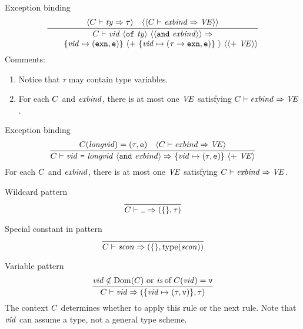 
\begin{inference-rule}{Exception binding}
\begin{equation}\label{rule:static-core:exnbind1}
  \vcenter{\infer{\deduce{\qquad\{\vid\mapsto(\EXCN,\ise)\}\
      \optional{+\ \{\vid\mapsto(\tau\rightarrow\EXCN,\ise)\}\ }\
      \optional{\optional{ +\ \VE}}}
      {\C\ts\longvidexnbinda\ra}}
    {\optional{\C\ts\ty\ra\tau}
  & \optional{\optional{\C\ts\exnbind\ra\VE}}}}
\end{equation}
Comments:
\begin{enumerate}
\item Notice that $\tau$ may contain type variables.
\item For each $C$ and $\textit{exbind\/}$, there is at most one $\textit{V\kern-.05emE\/}$
  satisfying $C\vdash\textit{exbind\/}\Rightarrow\textit{V\kern-.05emE\/}$.
\end{enumerate}
\end{inference-rule}

\begin{inference-rule}{Exception binding}
\begin{equation}\label{rule:static-core:exnbind2}
  \vcenter{\infer{\C\ts\longvidexnbindb\ra\{\vid\mapsto(\tau,\ise)\}\ \optional{+\ \VE}}
    {\C(\longvid)=(\tau,\ise)
      & \optional{\C\ts\exnbind\ra\VE}}}
\end{equation}
For each $C$ and $\textit{exbind\/}$, there is at most one $\textit{V\kern-.05emE\/}$ satisfying
$C\vdash\textit{exbind\/}\Rightarrow\textit{V\kern-.05emE\/}$.
\end{inference-rule}


\begin{inference-rule}{Wildcard pattern}
\begin{equation}\label{rule:static-core:wildcard-pattern}
\vcenter{\infer{\C\ts\wildcard\ra (\emptymap,\tau)}{}}
\end{equation}
\end{inference-rule}

\begin{inference-rule}{Special constant in pattern}
\begin{equation}\label{rule:static-core:atpat:scon}
\vcenter{\infer{\C\ts\scon\ra (\emptymap,\scontype(\scon))}{}}
\end{equation}
\end{inference-rule}

\begin{inference-rule}{Variable pattern}
\begin{equation}\label{rule:static-core:variable-pattern}
  \vcenter{\infer{\C\ts\vid\ra (\{\vid\mapsto(\tau,\isv)\},\tau)}
    {\hbox{$\vid\notin\Dom(\C)$ or $\of{\is}{C(\vid)} = \isv$}}}
\end{equation}
The context $C$ determines whether to apply this rule or the next rule.
Note that $\textit{vid\/}$ can assume a type, not a general type scheme.
\end{inference-rule}

